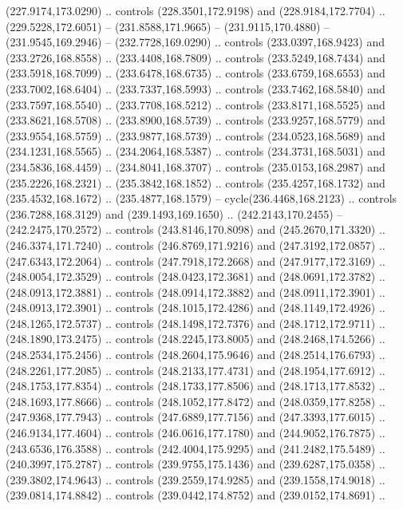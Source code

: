 \begin{scope}[cm={{1.25,0.0,0.0,-1.25,(0.0,442.91375)}}]
    (227.9174,173.0290) .. controls (228.3501,172.9198) and (228.9184,172.7704) ..
    (229.5228,172.6051) -- (231.8588,171.9665) -- (231.9115,170.4880) --
    (231.9545,169.2946) -- (232.7728,169.0290) .. controls (233.0397,168.9423) and
    (233.2726,168.8558) .. (233.4408,168.7809) .. controls (233.5249,168.7434) and
    (233.5918,168.7099) .. (233.6478,168.6735) .. controls (233.6759,168.6553) and
    (233.7002,168.6404) .. (233.7337,168.5993) .. controls (233.7462,168.5840) and
    (233.7597,168.5540) .. (233.7708,168.5212) .. controls (233.8171,168.5525) and
    (233.8621,168.5708) .. (233.8900,168.5739) .. controls (233.9257,168.5779) and
    (233.9554,168.5759) .. (233.9877,168.5739) .. controls (234.0523,168.5689) and
    (234.1231,168.5565) .. (234.2064,168.5387) .. controls (234.3731,168.5031) and
    (234.5836,168.4459) .. (234.8041,168.3707) .. controls (235.0153,168.2987) and
    (235.2226,168.2321) .. (235.3842,168.1852) .. controls (235.4257,168.1732) and
    (235.4532,168.1672) .. (235.4877,168.1579) -- cycle(236.4468,168.2123) ..
    controls (236.7288,168.3129) and (239.1493,169.1650) .. (242.2143,170.2455) --
    (242.2475,170.2572) .. controls (243.8146,170.8098) and (245.2670,171.3320) ..
    (246.3374,171.7240) .. controls (246.8769,171.9216) and (247.3192,172.0857) ..
    (247.6343,172.2064) .. controls (247.7918,172.2668) and (247.9177,172.3169) ..
    (248.0054,172.3529) .. controls (248.0423,172.3681) and (248.0691,172.3782) ..
    (248.0913,172.3881) .. controls (248.0914,172.3882) and (248.0911,172.3901) ..
    (248.0913,172.3901) .. controls (248.1015,172.4286) and (248.1149,172.4926) ..
    (248.1265,172.5737) .. controls (248.1498,172.7376) and (248.1712,172.9711) ..
    (248.1890,173.2475) .. controls (248.2245,173.8005) and (248.2468,174.5266) ..
    (248.2534,175.2456) .. controls (248.2604,175.9646) and (248.2514,176.6793) ..
    (248.2261,177.2085) .. controls (248.2133,177.4731) and (248.1954,177.6912) ..
    (248.1753,177.8354) .. controls (248.1733,177.8506) and (248.1713,177.8532) ..
    (248.1693,177.8666) .. controls (248.1052,177.8472) and (248.0359,177.8258) ..
    (247.9368,177.7943) .. controls (247.6889,177.7156) and (247.3393,177.6015) ..
    (246.9134,177.4604) .. controls (246.0616,177.1780) and (244.9052,176.7875) ..
    (243.6536,176.3588) .. controls (242.4004,175.9295) and (241.2482,175.5489) ..
    (240.3997,175.2787) .. controls (239.9755,175.1436) and (239.6287,175.0358) ..
    (239.3802,174.9643) .. controls (239.2559,174.9285) and (239.1558,174.9018) ..
    (239.0814,174.8842) .. controls (239.0442,174.8752) and (239.0152,174.8691) ..

\end{scope}
